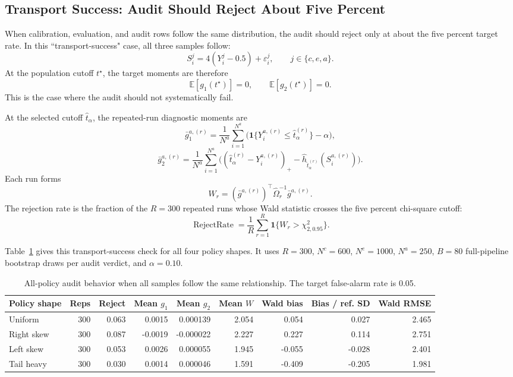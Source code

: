 \documentclass[11pt]{article}
\newcommand{\ind}{\mathbf{1}}
\begin{document}
\subsection{Transport Success: Audit Should Reject About Five Percent}

When calibration, evaluation, and audit rows follow the same distribution, the
audit should reject only at about the five percent target rate.  In this
``transport-success" case, all three samples follow:
\[
  S_i^j = 4(Y_i^j-0.5)+\varepsilon_i^j,
  \qquad
  j\in\{c,e,a\}.
\]
At the population cutoff \(t^\star\), the target moments are therefore
\[
  \mathbb{E}[g_1(t^\star)]=0,
  \qquad
  \mathbb{E}[g_2(t^\star)]=0.
\]
This is the case where the audit should not systematically fail.

At the selected cutoff \(\hat t_\alpha\), the repeated-run diagnostic moments
are
\[
  \bar g_{1}^{a,(r)}
  =
  \frac{1}{N^a}\sum_{i=1}^{N^a}
  \bigl(\ind\{Y_i^{a,(r)}\le \hat t_{\alpha}^{(r)}\}-\alpha\bigr),
\]
\[
  \bar g_{2}^{a,(r)}
  =
  \frac{1}{N^a}\sum_{i=1}^{N^a}
  \bigl((\hat t_{\alpha}^{(r)}-Y_i^{a,(r)})_+
  -\hat h_{\hat t_{\alpha}^{(r)}}(S_i^{a,(r)})\bigr).
\]
Each run forms
\[
  W_r
  =
  (\bar g^{a,(r)})^\top
  \hat\Omega_r^{-1}
  \bar g^{a,(r)}.
\]
The rejection rate is the fraction of the
\(R=300\) repeated runs whose Wald statistic crosses the five percent
chi-square cutoff:
\[
  \operatorname{RejectRate}
  =
  \frac{1}{R}
  \sum_{r=1}^{R}
  \ind\{W_r>\chi^2_{2,0.95}\}.
\]

Table~\ref{tab-audit-bias} gives this transport-success check for all four policy shapes.
It uses \(R=300\), \(N^c=600\), \(N^e=1000\), \(N^a=250\), \(B=80\)
full-pipeline bootstrap draws per audit verdict, and \(\alpha=0.10\).

\begin{table}[htbp]
\centering
\scriptsize
\setlength{\tabcolsep}{3.5pt}
\begin{tabular}{@{}lrrrrrrrr@{}}
\toprule
Policy shape & Reps & Reject & Mean \(g_1\) & Mean \(g_2\) & Mean \(W\) & Wald bias & Bias / ref. SD & Wald RMSE \\
\midrule
Uniform & 300 & 0.063 & 0.0015 & 0.000139 & 2.054 & 0.054 & 0.027 & 2.465 \\
Right skew & 300 & 0.087 & -0.0019 & -0.000022 & 2.227 & 0.227 & 0.114 & 2.751 \\
Left skew & 300 & 0.053 & 0.0026 & 0.000055 & 1.945 & -0.055 & -0.028 & 2.401 \\
Tail heavy & 300 & 0.030 & 0.0014 & 0.000046 & 1.591 & -0.409 & -0.205 & 1.981 \\
\bottomrule
\end{tabular}
\caption{All-policy audit behavior when all samples follow the same relationship.  The target false-alarm rate is 0.05.}
\label{tab-audit-bias}
\end{table}
\end{document}
